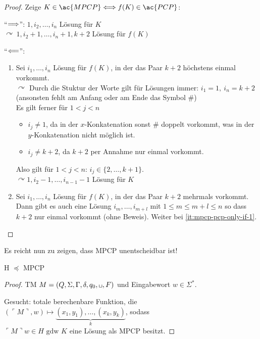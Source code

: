 {\begin{proof}
	Zeige $K \in \ac{MPCP} \<==> f(K) \in \ac{PCP}$:
	
	"`$\==>$"': $1, i_2, \dots, i_n$ Lösung für $K$\\
	$\curvearrowright\ 1, i_{2}+1, \dots, i_{n}+1, k+2$ Lösung für $f(K)$
	
	"`$\<==$"':
  \begin{enumerate}
  \item \label{it:mpcp-pcp-only-if-1} Sei $i_1, \dots, i_n$ Lösung für $f(K)$, in der das Paar $k+2$ höchstens einmal vorkommt.\\
  $\curvearrowright$  Durch die Stuktur der Worte gilt für Lösungen immer: $ i_1=1,\ i_n=k+2 $ (ansonsten fehlt am Anfang oder am Ende das Symbol $\#$)\\
  Es gilt ferner für $1 < j < n$
  \begin{itemize}
  \item $i_j \neq 1$, da in der $x$-Konkatenation sonst $\#$ doppelt vorkommt, was in der $y$-Konkatenation nicht möglich ist.
  \item $i_j \neq k+2$, da $k+2$ per Annahme nur einmal vorkommt.
  \end{itemize}
  Also gilt für $1 < j < n$: $i_j \in \{2, \dots, k+1\}$.\\
	$\curvearrowright 1, i_{2}-1, \dots, i_{n-1}-1$ Lösung für $K$
\item Sei $i_1, \dots, i_n$ Lösung für $f(K)$, in der das Paar $k+2$ mehrmals vorkommt.
  Dann gibt es auch eine Lösung $i_m,\dots,i_{m+l}$ mit $1 \le m \le m+l \le n$ so dass $k+2$ nur einmal vorkommt (ohne Beweis).
  Weiter bei \ref{it:mpcp-pcp-only-if-1}.
  \end{enumerate}

\end{proof}
Es reicht nun zu zeigen, dass \ac{MPCP} unentscheidbar ist!

\begin{lemma}[name={[H $\preceq$ \ac{MPCP}]}] 
	H $\preceq$ \ac{MPCP}
\end{lemma}
\begin{proof}
	\ac{TM} $M=(Q,\Sigma,\Gamma,\delta,q_0,\blank,F)$ und Eingabewort $w\in\Sigma^*$.
	
	Gesucht: totale berechenbare Funktion, die $(\ulcorner M \urcorner, w) \mapsto \underbrace{(x_1,y_1),\dots,(x_k,y_k)}_k$, sodass\\
	$\ulcorner M \urcorner w\in H \text{ gdw } K$ eine Lösung als \ac{MPCP} besitzt.
	

\end{proof}}
